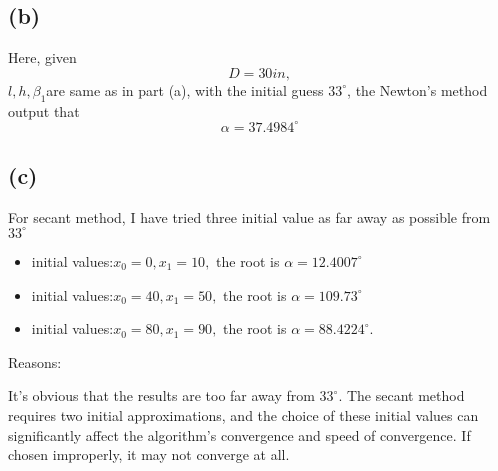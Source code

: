 \documentclass[a4paper]{article}
\begin{document}
\subsection*{(b)}
Here, given $$D = 30 in,$$ $l,h,\beta_1$are same as in part (a), with the initial guess $33^{\circ}$, the Newton's method output that
$$\alpha = 37.4984^{\circ} $$
\subsection*{(c)}
For secant method, I have tried three initial value as far away as possible from $33^{\circ}$
\begin{itemize}  
  \item initial values:$x_0 = 0 , x_1 = 10,$ the root is $\alpha = 12.4007^{\circ}$  
  \item initial values:$x_0 = 40 , x_1 = 50,$ the root is $\alpha = 109.73^{\circ}$   
  \item initial values:$x_0 = 80 , x_1 = 90,$ the root is $\alpha = 88.4224^{\circ}.$  
\end{itemize}  
Reasons:

It's obvious that the results are too far away from $33^{\circ}.$ The secant method requires two initial approximations, 
and the choice of these initial values can significantly affect the algorithm's convergence and speed of convergence. If chosen improperly, it may not converge at all.
\end{document}
